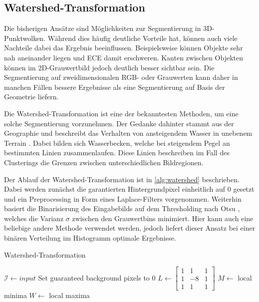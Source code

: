 \subsection{Watershed-Transformation}
\label{subsec:watershed}

Die bisherigen Ansätze sind Möglichkeiten zur Segmentierung in 3D-Punktwolken.
Während dies häufig deutliche Vorteile hat, können auch viele Nachteile dabei das Ergebnis beeinflussen.
Beispielsweise können Objekte sehr nah aneinander liegen und \ac{ECE} damit erschweren.
Kanten zwischen Objekten können im 2D-Grauwertbild jedoch deutlich besser sichtbar sein.
Die Segmentierung auf zweidimensionalen RGB- oder Grauwerten kann daher in manchen Fällen bessere Ergebnisse als eine Segmentierung auf Basis der Geometrie liefern.

Die Watershed-Transformation ist eine der bekanntesten Methoden, um eine solche Segmentierung vorzunehmen.
Der Gedanke dahinter stammt aus der Geographie und beschreibt das Verhalten von ansteigendem Wasser in unebenem Terrain \cite[1--2]{roerdink2000watershed}.
Dabei bilden sich Wasserbecken, welche bei steigendem Pegel an bestimmten Linien zusammenlaufen.
Diese Linien beschreiben im Fall des Clusterings die Grenzen zwischen unterschiedlichen Bildregionen.

Der Ablauf der Watershed-Transformation ist in \autoref{alg:watershed} beschrieben.
Dabei werden zunächst die garantierten Hintergrundpixel einheitlich auf 0 gesetzt und ein Preprocessing in Form eines Laplace-Filters vorgenommen.
Weiterhin basiert die Binarisierung des Eingabebilds auf dem Thresholding nach Otsu \cite{otsu1979threshold}, welches die Varianz $\sigma$ zwischen den Grauwertbins minimiert.
Hier kann auch eine beliebige andere Methode verwendet werden, jedoch liefert dieser Ansatz bei einer binären Verteilung im Histogramm optimale Ergebnisse.

\begin{algorithm}
\caption[Watershed-Transformation]{Watershed-Transformation \cite{openCVwatershed}}
\label{alg:watershed}
\begin{algorithmic}
\State $\mathcal{I} \gets input$
\State Set guaranteed background pixels to $0$
\State $L \gets \begin{bmatrix}1 & 1 & 1\\1 & -8 & 1\\1 & 1 & 1\end{bmatrix}$
\State {}
\State {}
\State {}
\State $M \gets$ local minima
\State $W \gets$ local maxima
\State {}
	\State {}
\EndFor
\end{algorithmic}
\end{algorithm}


